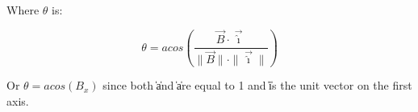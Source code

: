 \documentclass[a4paper,11pt]{article}
\begin{document}
Where $\theta$ is:

\begin{equation}
    \theta = acos \left(\frac{\vec{B} \cdot \vec{\hat{\imath}}}{\|\vec{B}\| \cdot \|\vec{\hat{\imath}}\|} \right)
\end{equation}

Or $\theta = acos (B_x)$ since both \|\| and \|\vec{\hat{\imath}}\| are equal to 1 and \|\vec{\hat{\imath}}\| is the unit vector on the first axis.
\end{document}
